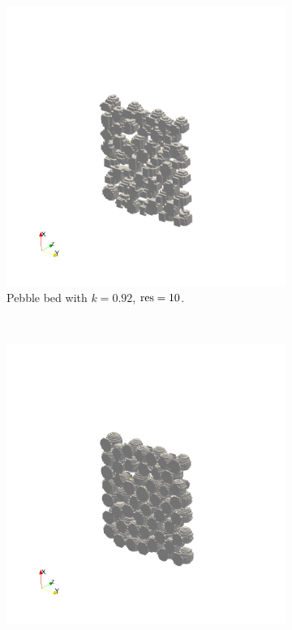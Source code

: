 \begin{figure}[h]
        \centering
        \begin{subfigure}[b]{0.3\textwidth}
                \includegraphics[width=\textwidth, trim={200pt, 150pt, 200pt, 200pt},clip]{figures/lbm/k092res10}
                \caption{Pebble bed with $k = 0.92$, $\text{res} = 10$.}
                \label{fig:k092res10}
        \end{subfigure}%
        ~
        \begin{subfigure}[b]{0.3\textwidth}
                \includegraphics[width=\textwidth, trim={200pt, 150pt, 200pt, 200pt},clip]{figures/lbm/k0947res20}

\end{subfigure}
\end{figure}
